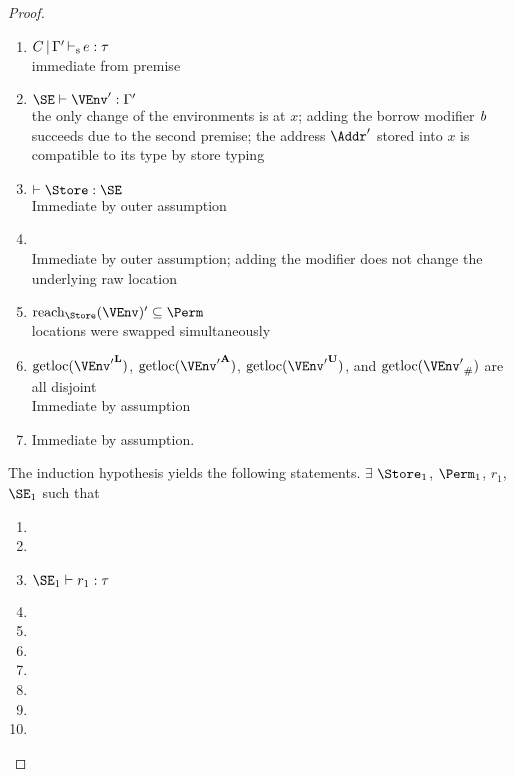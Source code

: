 \begin{proof}
  \begin{enumerate}[({A1-}1)]
  \item $C \operatorname{|} \Gamma' \operatorname{\vdash_s} e : \tau$ \\
    immediate from premise
  \item $\SE \vdash \VEnv' : \E'$ \\
    the only change of the environments is at $x$; adding the borrow
    modifier $\textit{b}$ succeeds due to the second premise; the address $\Addr'$
    stored into $x$ is compatible to its type by store typing
  \item $\vdash \Store : \SE$ \\
    Immediate by outer assumption
  \item\label{item:11} \assumeWellformed{} \\
    Immediate by outer assumption; adding the modifier does not change
    the underlying raw location
  \item\label{item:12} $\Reach\Store\VEnv' \subseteq \Perm$ \\
    locations were swapped simultaneously
  \item $\Rawloc{\Active{\VEnv'}}$,
    $\Rawloc{\MutableBorrows{\VEnv'}}$,
    $\Rawloc{\ImmutableBorrows{\VEnv'}}$, and
    $\Rawloc{\Suspended{\VEnv'}}$ are all disjoint \\
    Immediate by assumption
  \item\label{item:15} 
    Immediate by assumption.
  \end{enumerate}

  The induction hypothesis yields the following statements.
  $\exists$ $\Store_1$, $\Perm_1$, $r_1$, $\SE_1$ such that
  \begin{enumerate}[({R1-}1)]
  \item {}
  \item {}
  \item $\SE_1 \vdash r_1 : \tau$
  \item {}
  \item {}
  \item {}
  \item {}
  \item {}
  \item {}
  \item {}
  \end{enumerate}


\end{proof}
